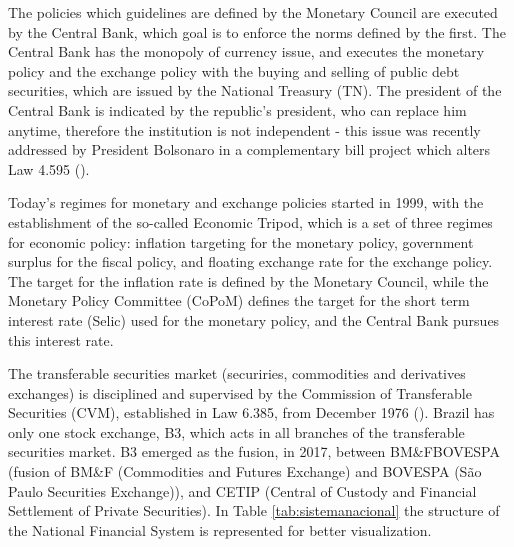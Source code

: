 \documentclass[cic,tc, english]{iiufrgs}
\begin{document}
    The policies which guidelines are defined by the Monetary Council are executed by the Central Bank, which goal is to enforce the norms defined by the first. The Central Bank has the monopoly of currency issue, and executes the monetary policy and the exchange policy with the buying and selling of public debt securities, which are issued by the National Treasury (TN). The president of the Central Bank is indicated by the republic's president, who can replace him anytime, therefore the institution is not independent - this issue was recently addressed by President Bolsonaro in a complementary bill project which alters Law 4.595 (\citet{lei4595}).

    Today's regimes for monetary and exchange policies started in 1999, with the establishment of the so-called Economic Tripod, which is a set of three regimes for economic policy: inflation targeting for the monetary policy, government surplus for the fiscal policy, and floating exchange rate for the exchange policy. The target for the inflation rate is defined by the Monetary Council, while the Monetary Policy Committee (CoPoM) defines the target for the short term interest rate (Selic) used for the monetary policy, and the Central Bank pursues this interest rate.

    The transferable securities market (securiries, commodities and derivatives exchanges) is disciplined and supervised by the Commission of Transferable Securities (CVM), established in Law 6.385, from December 1976 (\citet{lei6385}). Brazil has only one stock exchange, B3, which acts in all branches of the transferable securities market. B3 emerged as the fusion, in 2017, between BM\&FBOVESPA (fusion of BM\&F (Commodities and Futures Exchange) and BOVESPA (São Paulo Securities Exchange)), and CETIP (Central of Custody and Financial Settlement of Private Securities).  In Table \ref{tab:sistemanacional} the structure of the National Financial System is represented for better visualization.
\end{document}
